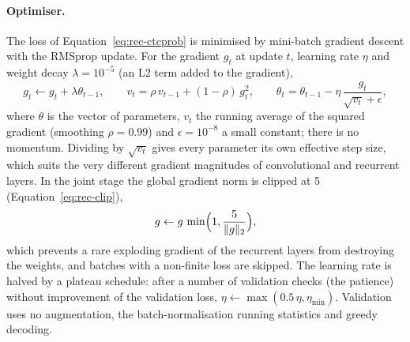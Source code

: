 \paragraph{Optimiser.}
The loss of Equation~\ref{eq:rec-ctcprob} is minimised by mini-batch gradient descent with the RMSprop update.
For the gradient $g_t$ at update $t$, learning rate $\eta$ and weight decay $\lambda=10^{-5}$ (an L2 term added to the gradient),
\begin{equation}
g_t\leftarrow g_t+\lambda\theta_{t-1},\qquad v_t=\rho\,v_{t-1}+(1-\rho)\,g_t^2,\qquad \theta_t=\theta_{t-1}-\eta\,\frac{g_t}{\sqrt{v_t}+\epsilon},
\label{eq:rec-rmsprop}
\end{equation}
where $\theta$ is the vector of parameters, $v_t$ the running average of the squared gradient (smoothing $\rho=0.99$) and $\epsilon=10^{-8}$ a small constant; there is no momentum.
Dividing by $\sqrt{v_t}$ gives every parameter its own effective step size, which suits the very different gradient magnitudes of convolutional and recurrent layers.
In the joint stage the global gradient norm is clipped at 5 (Equation~\ref{eq:rec-clip}),
\begin{equation}
g\leftarrow g\,\min\Bigl(1,\frac{5}{\|g\|_2}\Bigr),
\label{eq:rec-clip}
\end{equation}
which prevents a rare exploding gradient of the recurrent layers from destroying the weights, and batches with a non-finite loss are skipped.
The learning rate is halved by a plateau schedule: after a number of validation checks (the patience) without improvement of the validation loss, $\eta\leftarrow\max(0.5\,\eta,\eta_{\min})$.
Validation uses no augmentation, the batch-normalisation running statistics and greedy decoding.

